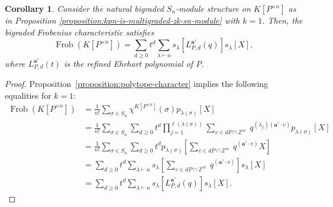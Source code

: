 \documentclass[a4paper,12pt]{amsart}
\theoremstyle{plain}
\newtheorem{corollary}[theorem]{Corollary}
\theoremstyle{definition}
\theoremstyle{remark}
\DeclareMathOperator{\Frob}{Frob}
\begin{document}
\begin{corollary} \label{corollary:frobenius-characteristic}
    Consider the natural bigraded $S_n$-module structure on $K[P^{\times n}]$ as in Proposition \ref{proposition:kpn-is-multigraded-zk-sn-module} with $k = 1$. Then, the bigraded Frobenius characteristic satisfies
    \[
    \Frob(K[P^{\times n}]) = \sum_{d \geq 0} t^d \sum_{\lambda \vdash n} s_\lambda \left [ L_{P, d}^{\bm{a}'}(q) \right ] s_\lambda[X],
    \]
    where $L_{P, d}^{\bm{a}'}(t)$ is the refined Ehrhart polynomial of $P$.
\end{corollary}

\begin{proof}
    Proposition~\ref{proposition:polytope-character} implies the following equalities for $k = 1$:
    \begin{align*}
       \Frob(K[P^{\times n}])
        &= \frac{1}{n!}\sum_{\sigma \in S_n}  \chi^{K[P^{\times n}]}(\sigma) p_{\lambda(\sigma)}[X] \\
        &= \frac{1}{n!} \sum_{\sigma \in S_n} \sum_{d \geq 0} t^d
        \prod_{j = 1}^{\ell(\lambda(\sigma))} \sum_{v \in dP \cap \mathbb{Z}^m} ~
        q^{(\lambda_j) (\bm{a}' \cdot v)} p_{\lambda(\sigma)}[X] \\
        &= \frac{1}{n!} \sum_{\sigma \in S_n} \sum_{d \geq 0} t^d
        p_{\lambda(\sigma)} \left [ \sum_{v \in dP \cap \mathbb{Z}^m} ~
        q^{(\bm{a}' \cdot v)} X \right ] \\
        &= \sum_{d \geq 0} t^d \sum_{\lambda \vdash n} s_\lambda \left [ \sum_{v \in dP \cap \mathbb{Z}^m} ~
        q^{(\bm{a}' \cdot v)} \right ] s_\lambda[X] \\
        &= \sum_{d \geq 0} t^d \sum_{\lambda \vdash n} s_\lambda \left [ L_{P, d}^{\bm{a}'}(q) \right ] s_\lambda[X].
    \end{align*}
\end{proof}
\end{document}
